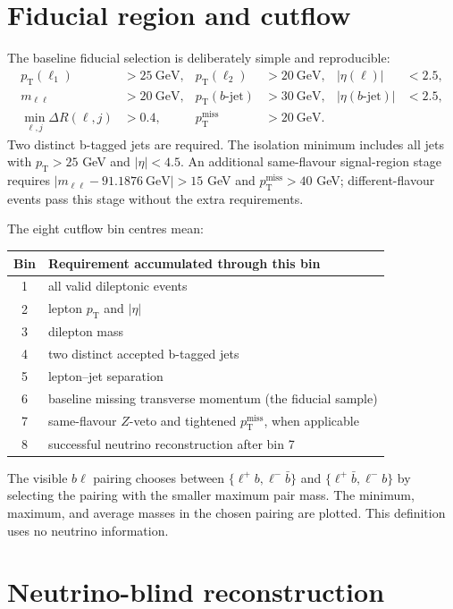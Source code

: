\documentclass[10pt,a4paper]{article}
\newcommand{\pt}{p_{\mathrm T}}
\newcommand{\met}{p_{\mathrm T}^{\mathrm{miss}}}
\newcommand{\dr}{\Delta R}
\newcommand{\lplus}{\ell^+}
\newcommand{\lminus}{\ell^-}
\begin{document}
\section{Fiducial region and cutflow}
\label{sec:fiducial}

The baseline fiducial selection is deliberately simple and reproducible:
\begin{align*}
 \pt(\ell_1)&>25\ \mathrm{GeV}, & \pt(\ell_2)&>20\ \mathrm{GeV},
 & |\eta(\ell)|&<2.5,\\
 m_{\ell\ell}&>20\ \mathrm{GeV}, &
 \pt(b\text{-jet})&>30\ \mathrm{GeV}, & |\eta(b\text{-jet})|&<2.5,\\
 \min_{\ell,j}\dr(\ell,j)&>0.4, & \met&>20\ \mathrm{GeV}.&&
\end{align*}
Two distinct b-tagged jets are required.  The isolation minimum includes all
jets with \(\pt>25\) GeV and \(|\eta|<4.5\).  An additional same-flavour
signal-region stage requires
\(|m_{\ell\ell}-91.1876\ \mathrm{GeV}|>15\) GeV and \(\met>40\) GeV;
different-flavour events pass this stage without the extra requirements.

The eight cutflow bin centres mean:
\begin{center}
\begin{tabular}{cl}
\toprule
Bin & Requirement accumulated through this bin\\
\midrule
1 & all valid dileptonic events\\
2 & lepton \(\pt\) and \(|\eta|\)\\
3 & dilepton mass\\
4 & two distinct accepted b-tagged jets\\
5 & lepton--jet separation\\
6 & baseline missing transverse momentum (the fiducial sample)\\
7 & same-flavour \(Z\)-veto and tightened \(\met\), when applicable\\
8 & successful neutrino reconstruction after bin 7\\
\bottomrule
\end{tabular}
\end{center}

The visible \(b\ell\) pairing chooses between
\(\{\lplus b,\lminus\bar b\}\) and
\(\{\lplus\bar b,\lminus b\}\) by selecting the pairing with the smaller
maximum pair mass.  The minimum, maximum, and average masses in the chosen
pairing are plotted.  This definition uses no neutrino information.

\section{Neutrino-blind reconstruction}
\end{document}
